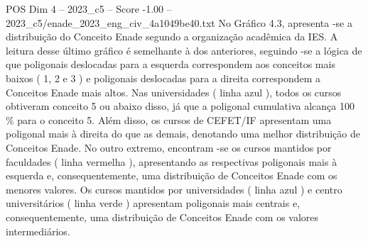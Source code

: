 \begin{textsample}{POS Dim 4 – 2023\_c5 – Score -1.00 – 2023\_c5/enade\_2023\_eng\_civ\_4a1049be40.txt}
No Gráfico 4.3, apresenta -se a distribuição do Conceito Enade segundo a organização acadêmica da IES.
A leitura desse último gráfico é semelhante à dos anteriores, seguindo -se a lógica de que poligonais deslocadas para a esquerda correspondem aos conceitos mais baixos ( 1, 2 e 3 ) e poligonais deslocadas para a direita correspondem a Conceitos Enade mais altos.
Nas universidades ( linha azul ), todos os cursos obtiveram conceito 5 ou abaixo disso, já que a poligonal cumulativa alcança 100 \% para o conceito 5.
Além disso, os cursos de CEFET/IF apresentam uma poligonal mais à direita do que as demais, denotando uma melhor distribuição de Conceitos Enade.
No outro extremo, encontram -se os cursos mantidos por faculdades ( linha vermelha ), apresentando as respectivas poligonais mais à esquerda e, consequentemente, uma distribuição de Conceitos Enade com os menores valores.
Os cursos mantidos por universidades ( linha azul ) e centro universitários ( linha verde ) apresentam poligonais mais centrais e, consequentemente, uma distribuição de Conceitos Enade com os valores intermediários.

\end{textsample}
